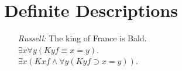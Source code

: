 \documentclass[a4paper, 11pt]{article} %
\begin{document}
\section*{Definite Descriptions}

\begin{enumerate}
  \item[\it Russell:] The king of France is Bald.\\ 
    $\exists x\forall y(Kyf \equiv x=y)$.\\
    $\exists x(Kxf \wedge \forall y(Kyf \supset x=y))$.\\
\end{enumerate}






\end{document}
